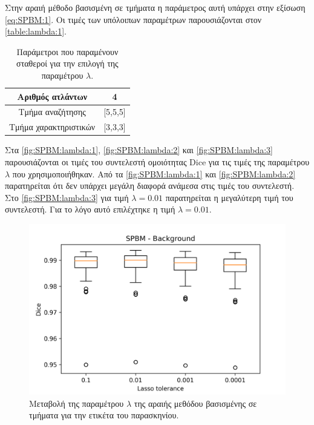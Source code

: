 \documentclass[a4paper,12pt]{article}
\begin{document}
Στην αραιή μέθοδο βασισμένη σε τμήματα η παράμετρος αυτή υπάρχει στην εξίσωση
\eqref{eq:SPBM:1}. Οι τιμές των υπόλοιπων παραμέτρων παρουσιάζονται στον
\autoref{table:lambda:1}.

\begin{table}[h!]
    \centering
    \begin{tabular}{|c|c|} 
        \hline
        Αριθμός ατλάντων & 4 \\ 
        \hline
        Τμήμα αναζήτησης & [5,5,5] \\ 
        \hline
        Τμήμα χαρακτηριστικών & [3,3,3] \\ 
        \hline
    \end{tabular}
    \caption{Παράμετροι που παραμένουν σταθεροί για την επιλογή της παραμέτρου
             $\lambda$.}
    \label{table:lambda:1}
\end{table}

Στα \autoref{fig:SPBM:lambda:1}, \autoref{fig:SPBM:lambda:2} και
\autoref{fig:SPBM:lambda:3} παρουσιάζονται οι τιμές του συντελεστή ομοιότητας
Dice για τις τιμές της παραμέτρου $\lambda$ που χρησιμοποιήθηκαν. Από τα
\autoref{fig:SPBM:lambda:1} και \autoref{fig:SPBM:lambda:2} παρατηρείται ότι
δεν υπάρχει μεγάλη διαφορά ανάμεσα στις τιμές του συντελεστή. Στο
\autoref{fig:SPBM:lambda:3} για τιμή $\lambda = 0.01$ παρατηρείται η μεγαλύτερη
τιμή του συντελεστή. Για το λόγο αυτό επιλέχτηκε η τιμή $\lambda = 0.01$.

\begin{figure}[H]
    \centering
    \includegraphics[width=0.85\linewidth]{SPBM_Lasso_tolerance_Background_plot.png}
    \caption{Μεταβολή της παραμέτρου $\lambda$ της αραιής μεθόδου βασισμένης σε
             τμήματα για την ετικέτα του παρασκηνίου.}
    \label{fig:SPBM:lambda:1}
\end{figure}
\end{document}
